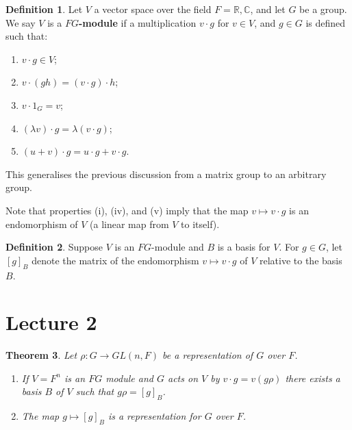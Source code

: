 \documentclass[11pt, notitlepage]{article}
\numberwithin{equation}{section}
\theoremstyle{plain}
\newtheorem{theorem}{Theorem}[section]
\theoremstyle{definition}
\newtheorem{definition}[theorem]{Definition}
\newcommand{\R}{\mathbb{R}}
\newcommand{\C}{\mathbb{C}}
\begin{document}
\begin{definition}
Let $V$ a vector space over the field $F = \R,\C$, and let $G$ be a group. We say $V$ is a \textbf{$FG$-module} if a multiplication $v \cdot g$ for $v \in V$, and $g \in G$ is defined such that:
\begin{enumerate}[label=(\roman*)]
    \item $v \cdot g \in V$;
    \item $v \cdot (gh) = (v \cdot g) \cdot h$;
    \item $v \cdot 1_G = v$;
    \item $(\lambda v) \cdot g = \lambda(v \cdot g)$;
    \item $(u + v) \cdot g = u \cdot g + v \cdot g$.
\end{enumerate}
\end{definition}

This generalises the previous discussion from a matrix group to an arbitrary group.

Note that properties (i), (iv), and (v) imply that the map $v \mapsto v \cdot g$ is an endomorphism of $V$ (a linear map from $V$ to itself).

\begin{definition}
Suppose $V$ is an $FG$-module and $B$ is a basis for $V$. For $g \in G$, let $[g]_B$ denote the matrix of the endomorphism $v \mapsto v \cdot g$ of $V$ relative to the basis $B$.
\end{definition}























\section{Lecture 2}


\begin{theorem}
Let $\rho: G \to GL(n,F)$ be a representation of $G$ over $F$.
	\begin{enumerate}[label=\emph{(\Roman*)}]
	\item If $V=F^n$ is an $FG$ module and $G$ acts on $V$ by $v \cdot g = v (g\rho)$ there exists a basis $B$ of $V$ such that $g\rho = [g]_B$.
	\item The map $g \mapsto [g]_B$ is a representation for $G$ over $F$.
\end{enumerate}
\end{theorem}
\end{document}
